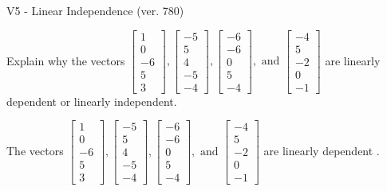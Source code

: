 \begin{exercise}
  \begin{exerciseTitle}V5 - Linear Independence (ver. 780)\end{exerciseTitle}
  \begin{exerciseStatement}
    Explain why the vectors \(\left[\begin{array}{r}
1 \\
0 \\
-6 \\
5 \\
3
\end{array}\right] , \left[\begin{array}{r}
-5 \\
5 \\
4 \\
-5 \\
-4
\end{array}\right] , \left[\begin{array}{r}
-6 \\
-6 \\
0 \\
5 \\
-4
\end{array}\right] , \text{ and } \left[\begin{array}{r}
-4 \\
5 \\
-2 \\
0 \\
-1
\end{array}\right]\) are linearly dependent or linearly independent.	


  \end{exerciseStatement}
  \begin{exerciseAnswer}
   The vectors \(\left[\begin{array}{r}
1 \\
0 \\
-6 \\
5 \\
3
\end{array}\right] , \left[\begin{array}{r}
-5 \\
5 \\
4 \\
-5 \\
-4
\end{array}\right] , \left[\begin{array}{r}
-6 \\
-6 \\
0 \\
5 \\
-4
\end{array}\right] , \text{ and } \left[\begin{array}{r}
-4 \\
5 \\
-2 \\
0 \\
-1
\end{array}\right]\) are 
  	 linearly dependent  .
  


  \end{exerciseAnswer}
\end{exercise}